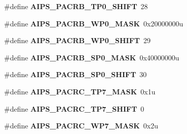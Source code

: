 \begin{DoxyCompactItemize}
\item 
\#define {\bfseries A\+I\+P\+S\+\_\+\+P\+A\+C\+R\+B\+\_\+\+T\+P0\+\_\+\+S\+H\+I\+FT}~28\hypertarget{group__AIPS__Register__Masks_gadfe5ca43a0feeca2dec0c39051c9c2e2}{}\label{group__AIPS__Register__Masks_gadfe5ca43a0feeca2dec0c39051c9c2e2}

\item 
\#define {\bfseries A\+I\+P\+S\+\_\+\+P\+A\+C\+R\+B\+\_\+\+W\+P0\+\_\+\+M\+A\+SK}~0x20000000u\hypertarget{group__AIPS__Register__Masks_gab296240a3309bbec807d04984f43afc7}{}\label{group__AIPS__Register__Masks_gab296240a3309bbec807d04984f43afc7}

\item 
\#define {\bfseries A\+I\+P\+S\+\_\+\+P\+A\+C\+R\+B\+\_\+\+W\+P0\+\_\+\+S\+H\+I\+FT}~29\hypertarget{group__AIPS__Register__Masks_ga92ba26e1b70a4103215a4843f8682bb6}{}\label{group__AIPS__Register__Masks_ga92ba26e1b70a4103215a4843f8682bb6}

\item 
\#define {\bfseries A\+I\+P\+S\+\_\+\+P\+A\+C\+R\+B\+\_\+\+S\+P0\+\_\+\+M\+A\+SK}~0x40000000u\hypertarget{group__AIPS__Register__Masks_ga8c4083394fd1c5a1bdf0f5e75a3eada3}{}\label{group__AIPS__Register__Masks_ga8c4083394fd1c5a1bdf0f5e75a3eada3}

\item 
\#define {\bfseries A\+I\+P\+S\+\_\+\+P\+A\+C\+R\+B\+\_\+\+S\+P0\+\_\+\+S\+H\+I\+FT}~30\hypertarget{group__AIPS__Register__Masks_gacc4da8bd7ed1f2724720ba203ab6a7a1}{}\label{group__AIPS__Register__Masks_gacc4da8bd7ed1f2724720ba203ab6a7a1}

\item 
\#define {\bfseries A\+I\+P\+S\+\_\+\+P\+A\+C\+R\+C\+\_\+\+T\+P7\+\_\+\+M\+A\+SK}~0x1u\hypertarget{group__AIPS__Register__Masks_gaaa21e842a3c19740ed5519be7f4174b8}{}\label{group__AIPS__Register__Masks_gaaa21e842a3c19740ed5519be7f4174b8}

\item 
\#define {\bfseries A\+I\+P\+S\+\_\+\+P\+A\+C\+R\+C\+\_\+\+T\+P7\+\_\+\+S\+H\+I\+FT}~0\hypertarget{group__AIPS__Register__Masks_ga308aea1570514208ec613685bee78edd}{}\label{group__AIPS__Register__Masks_ga308aea1570514208ec613685bee78edd}

\item 
\#define {\bfseries A\+I\+P\+S\+\_\+\+P\+A\+C\+R\+C\+\_\+\+W\+P7\+\_\+\+M\+A\+SK}~0x2u\hypertarget{group__AIPS__Register__Masks_ga67823a6b21a06114e32e26ea29415584}{}\label{group__AIPS__Register__Masks_ga67823a6b21a06114e32e26ea29415584}


\end{DoxyCompactItemize}
